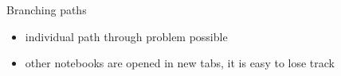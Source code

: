 \documentclass[svgnames]{beamer}
\begin{document}
\begin{frame}{Branching paths}
 \begin{itemize}
  \item individual path through problem possible
  \item other notebooks are opened in new tabs, it is easy to lose track
 \end{itemize}
\end{frame}
\end{document}
